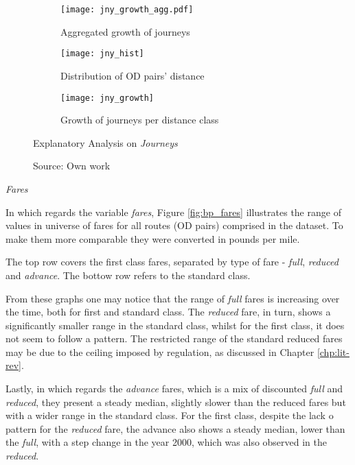 \begin{figure}[H]
\centering
\begin{subfigure}{\textwidth}
  \centering
  \texttt{[image: jny\_growth\_agg.pdf]}
  \caption{Aggregated growth of journeys}
  \label{fig:jny_growth_agg}
\end{subfigure}%

\begin{subfigure}{.5\textwidth}
  \centering
  \texttt{[image: jny\_hist]}
  \caption{Distribution of OD pairs' distance}
  \label{fig:jny_hist}
\end{subfigure}%
\begin{subfigure}{.5\textwidth}
  \centering
  \texttt{[image: jny\_growth]}
  \caption{Growth of journeys per distance class}
  \label{fig:jny_growth}
\end{subfigure}

\caption{Explanatory Analysis on \textit{Journeys}}
\label{fig:jny}
\caption*{Source: Own work}
\end{figure}

\textit{Fares}

In which regards the variable \textit{fares}, Figure \ref{fig:bp_fares} illustrates the range of values in universe of fares for all routes (OD pairs) comprised in the dataset. To make them more comparable they were converted in pounds per mile.

The top row covers the first class fares, separated by type of fare - \textit{full}, \textit{reduced} and \textit{advance}. The bottow row refers to the standard class.

From these graphs one may notice that the range of \textit{full} fares is increasing over the time, both for first and standard class. The \textit{reduced} fare, in turn, shows a significantly smaller range in the standard class, whilst for the first class, it does not seem to follow a pattern. The restricted range of the standard reduced fares may be due to the ceiling imposed by regulation, as discussed in Chapter \ref{chp:lit-rev}.

Lastly, in which regards the \textit{advance} fares, which is a mix of discounted \textit{full} and \textit{reduced}, they present a steady median, slightly slower than the reduced fares but with a wider range in the standard class. For the first class, despite the lack o pattern for the \textit{reduced} fare, the advance also shows a steady median, lower than the \textit{full}, with a step change in the year 2000, which was also observed in the \textit{reduced}. 

